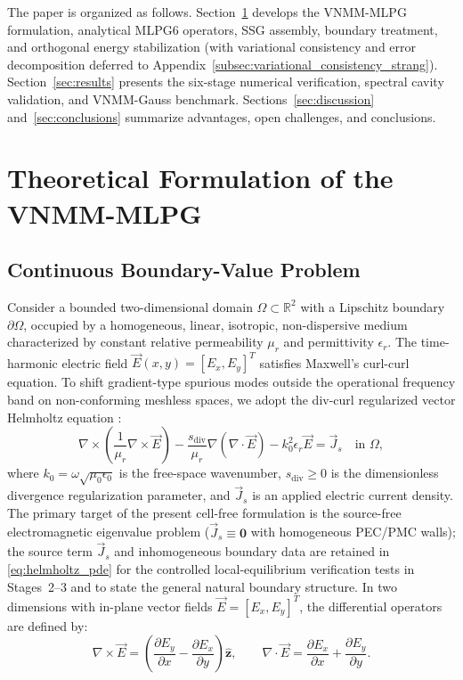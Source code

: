 \documentclass[VANCOUVER]{USG}
\begin{document}
The paper is organized as follows. Section~\ref{sec:formulation} develops the VNMM-MLPG formulation, analytical MLPG6 operators, SSG assembly, boundary treatment, and orthogonal energy stabilization (with variational consistency and error decomposition deferred to Appendix~\ref{subsec:variational_consistency_strang}). Section~\ref{sec:results} presents the six-stage numerical verification, spectral cavity validation, and VNMM-Gauss benchmark. Sections~\ref{sec:discussion} and~\ref{sec:conclusions} summarize advantages, open challenges, and conclusions.

\section{Theoretical Formulation of the VNMM-MLPG}
\label{sec:formulation}

\subsection{Continuous Boundary-Value Problem}
\label{subsec:continuous_bvp}

Consider a bounded two-dimensional domain $\Omega \subset \mathbb{R}^2$ with a Lipschitz boundary $\partial\Omega$, occupied by a homogeneous, linear, isotropic, non-dispersive medium characterized by constant relative permeability $\mu_r$ and permittivity $\epsilon_r$. The time-harmonic electric field $\vec{E}(x, y) = [E_x, E_y]^T$ satisfies Maxwell's curl-curl equation. To shift gradient-type spurious modes outside the operational frequency band on non-conforming meshless spaces, we adopt the div-curl regularized vector Helmholtz equation \cite{stable_vnmm2d_2026}:
\begin{equation}
    \nabla \times \left(\frac{1}{\mu_r} \nabla \times \vec{E}\right) - \frac{s_{\mathrm{div}}}{\mu_r} \nabla(\nabla \cdot \vec{E}) - k_0^2 \epsilon_r \vec{E} = \vec{J}_s \quad \text{in } \Omega,
    \label{eq:helmholtz_pde}
\end{equation}
where $k_0 = \omega\sqrt{\mu_0\epsilon_0}$ is the free-space wavenumber, $s_{\mathrm{div}} \ge 0$ is the dimensionless divergence regularization parameter, and $\vec{J}_s$ is an applied electric current density. The primary target of the present cell-free formulation is the source-free electromagnetic eigenvalue problem ($\vec{J}_s \equiv \mathbf{0}$ with homogeneous PEC/PMC walls); the source term $\vec{J}_s$ and inhomogeneous boundary data are retained in \eqref{eq:helmholtz_pde} for the controlled local-equilibrium verification tests in Stages~2--3 and to state the general natural boundary structure. In two dimensions with in-plane vector fields $\vec{E} = [E_x, E_y]^T$, the differential operators are defined by:
\begin{equation}
    \nabla \times \vec{E} = \left(\frac{\partial E_y}{\partial x} - \frac{\partial E_x}{\partial y}\right) \hat{\mathbf{z}}, \qquad \nabla \cdot \vec{E} = \frac{\partial E_x}{\partial x} + \frac{\partial E_y}{\partial y}.
\end{equation}
\end{document}
